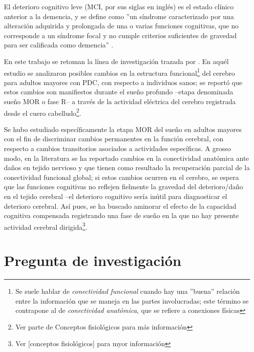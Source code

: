 \documentclass[12pt,a4paper]{mitthesis}
\begin{document}
El deterioro cognitivo leve (MCI, por sus siglas en ingl\'es) es el estado cl\'inico anterior a la
demencia, y se define como ''un s\'indrome caracterizado por una alteraci\'on adquirida y 
prolongada de una o varias funciones cognitivas, que no corresponde a un s\'indrome focal y no 
cumple criterios suficientes de gravedad para ser calificada como demencia'' \cite{Robles02}.

En este trabajo se retoman %
la l\'inea de investigaci\'on trazada por \cite{VazquezTagle16}.
En aqu\'el estudio se analizaron
posibles cambios en la estructura funcional\footnote{Se suele hablar de 
\textit{conectividad funcional} cuando hay una ''buena'' relaci\'on entre la informaci\'on
que se maneja en las partes involucradas; este t\'ermino se contrapone al de
\textit{conectividad anat\'omica}, que se refiere a conexiones f\'isicas}
del cerebro para adultos mayores con PDC, con 
respecto a individuos sanos; se report\'o que estos cambios son manifiestos durante el sue\~no
profundo --etapa denominada sue\~no MOR o fase R-- 
a trav\'es de la actividad el\'ectrica del cerebro registrada desde el cuero 
cabelludo\footnote{Ver parte de Conceptos fisiol\'ogicos para m\'as informaci\'on}. 

Se hubo estudiado espec\'ificamente la etapa MOR del sue\~no en adultos mayores
con el fin de discriminar
cambios permanentes en la funci\'on cerebral, con respecto a cambios transitorios asociados
a actividades espec\'ificas.
A grosso modo, en la literatura se ha reportado cambios en la conectividad anat\'omica
ante da\~nos en tejido nervioso y que tienen como resultado la recuperaci\'on parcial
de la conectividad funcional global; si estos cambios ocurren en el cerebro, se espera que las
funciones cognitivas no reflejen fielmente la gravedad del deterioro/da\~no en el tejido cerebral
--el deterioro cognitivo ser\'ia in\'util para diagnosticar el deterioro cerebral.
As\'i pues, se ha buscado aminorar el efecto de la capacidad cognitiva compensada
registrando una fase de sue\~no en la que no hay presente actividad cerebral 
dirigida\footnote{Ver [conceptos fisiol\'ogicos] para myor informaci\'on}.


\section{Pregunta de investigaci\'on}
\end{document}
